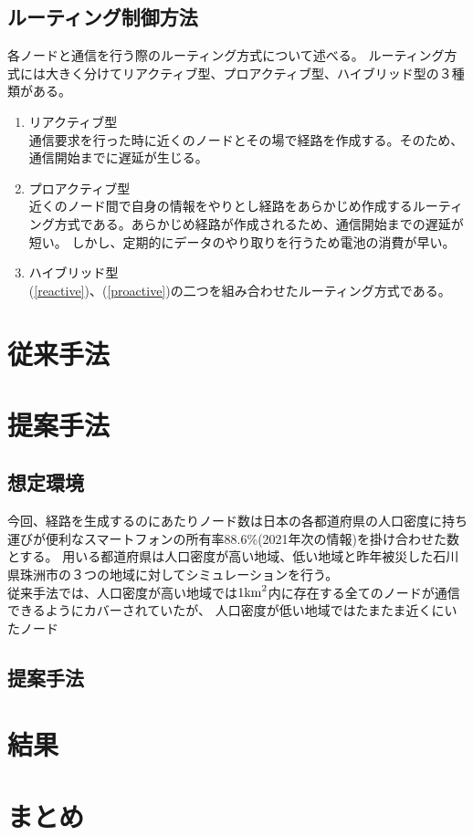 \documentclass[a4paper, 10pt]{ltjsarticle}
\begin{document}
\subsection{ルーティング制御方法}
各ノードと通信を行う際のルーティング方式について述べる。
ルーティング方式には大きく分けてリアクティブ型、プロアクティブ型、ハイブリッド型の３種類がある。
\begin{enumerate}
  \item \label{reactive} リアクティブ型\\通信要求を行った時に近くのノードとその場で経路を作成する。そのため、通信開始までに遅延が生じる。
  \item \label{proactive} プロアクティブ型\\近くのノード間で自身の情報をやりとし経路をあらかじめ作成するルーティング方式である。あらかじめ経路が作成されるため、通信開始までの遅延が短い。
  しかし、定期的にデータのやり取りを行うため電池の消費が早い。
  \item ハイブリッド型\\(\ref{reactive})、(\ref{proactive})の二つを組み合わせたルーティング方式である。
\end{enumerate}
\section{従来手法}
\section{提案手法}
\subsection{想定環境}
今回、経路を生成するのにあたりノード数は日本の各都道府県の人口密度に持ち運びが便利なスマートフォンの所有率88.6\%(2021年次の情報)を掛け合わせた数とする。%
用いる都道府県は人口密度が高い地域、低い地域と昨年被災した石川県珠洲市の３つの地域に対してシミュレーションを行う。
\\従来手法では、人口密度が高い地域では$1\rm{km}^2$内に存在する全てのノードが通信できるようにカバーされていたが、
人口密度が低い地域ではたまたま近くにいたノード
\subsection{提案手法}
\section{結果}

\section{まとめ}
\end{document}
